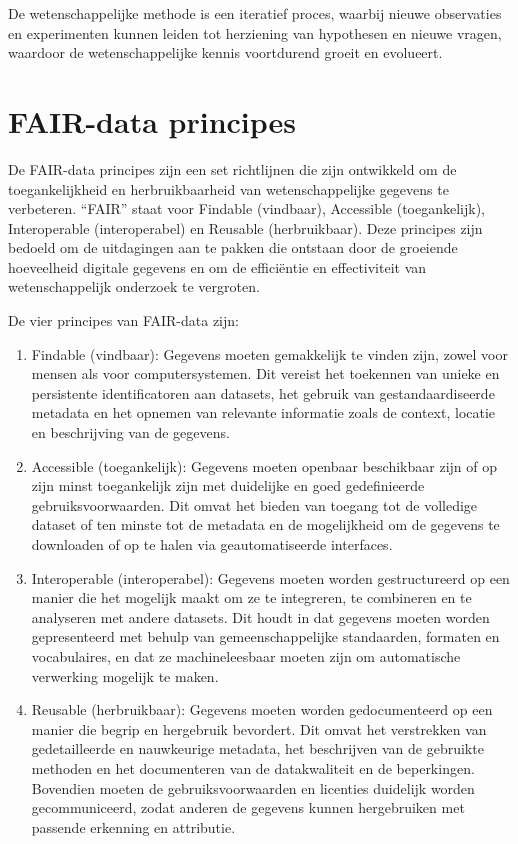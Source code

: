 \documentclass[
  letterpaper,
  DIV=11,
  numbers=noendperiod]{scrreprt}
\providecommand{\tightlist}{%
  \setlength{\itemsep}{0pt}\setlength{\parskip}{0pt}}\usepackage{longtable,booktabs,array}
\begin{document}
De wetenschappelijke methode is een iteratief proces, waarbij nieuwe
observaties en experimenten kunnen leiden tot herziening van hypothesen
en nieuwe vragen, waardoor de wetenschappelijke kennis voortdurend
groeit en evolueert.

\hypertarget{fair-data-principes}{%
\section{FAIR-data principes}\label{fair-data-principes}}

De FAIR-data principes zijn een set richtlijnen die zijn ontwikkeld om
de toegankelijkheid en herbruikbaarheid van wetenschappelijke gegevens
te verbeteren. ``FAIR'' staat voor Findable (vindbaar), Accessible
(toegankelijk), Interoperable (interoperabel) en Reusable
(herbruikbaar). Deze principes zijn bedoeld om de uitdagingen aan te
pakken die ontstaan door de groeiende hoeveelheid digitale gegevens en
om de efficiëntie en effectiviteit van wetenschappelijk onderzoek te
vergroten.

De vier principes van FAIR-data zijn:

\begin{enumerate}
\def\labelenumi{\arabic{enumi}.}
\tightlist
\item
  Findable (vindbaar): Gegevens moeten gemakkelijk te vinden zijn, zowel
  voor mensen als voor computersystemen. Dit vereist het toekennen van
  unieke en persistente identificatoren aan datasets, het gebruik van
  gestandaardiseerde metadata en het opnemen van relevante informatie
  zoals de context, locatie en beschrijving van de gegevens.
\item
  Accessible (toegankelijk): Gegevens moeten openbaar beschikbaar zijn
  of op zijn minst toegankelijk zijn met duidelijke en goed
  gedefinieerde gebruiksvoorwaarden. Dit omvat het bieden van toegang
  tot de volledige dataset of ten minste tot de metadata en de
  mogelijkheid om de gegevens te downloaden of op te halen via
  geautomatiseerde interfaces.
\item
  Interoperable (interoperabel): Gegevens moeten worden gestructureerd
  op een manier die het mogelijk maakt om ze te integreren, te
  combineren en te analyseren met andere datasets. Dit houdt in dat
  gegevens moeten worden gepresenteerd met behulp van gemeenschappelijke
  standaarden, formaten en vocabulaires, en dat ze machineleesbaar
  moeten zijn om automatische verwerking mogelijk te maken.
\item
  Reusable (herbruikbaar): Gegevens moeten worden gedocumenteerd op een
  manier die begrip en hergebruik bevordert. Dit omvat het verstrekken
  van gedetailleerde en nauwkeurige metadata, het beschrijven van de
  gebruikte methoden en het documenteren van de datakwaliteit en de
  beperkingen. Bovendien moeten de gebruiksvoorwaarden en licenties
  duidelijk worden gecommuniceerd, zodat anderen de gegevens kunnen
  hergebruiken met passende erkenning en attributie.
\end{enumerate}
\end{document}
